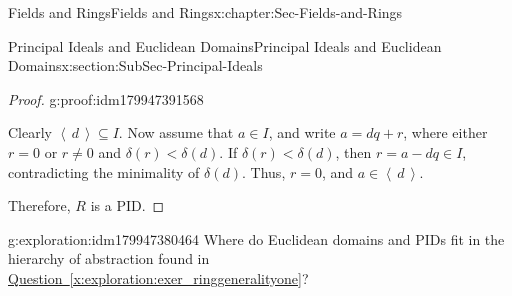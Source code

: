\documentclass[oneside,10pt,]{book}
\newcommand{\xreffont}{\relax}
\numberwithin{equation}{section}
\newcommand{\ideal}[1]{\left\langle\, #1 \,\right\rangle}
\newcommand{\lt}{<}
\begin{document}
\begin{chapterptx}{Fields and Rings}{}{Fields and Rings}{}{}{x:chapter:Sec-Fields-and-Rings}
\begin{sectionptx}{Principal Ideals and Euclidean Domains}{}{Principal Ideals and Euclidean Domains}{}{}{x:section:SubSec-Principal-Ideals}
\begin{proof}{}{g:proof:idm179947391568}
\par
Clearly \(\ideal{d}\subseteq I\). Now assume that \(a\in I\), and write \(a = dq + r\), where either \(r = 0\) or \(r\ne 0\) and \(\delta(r) \lt \delta(d)\). If \(\delta(r) \lt \delta(d)\), then \(r = a - dq \in I\), contradicting the minimality of \(\delta(d)\). Thus, \(r = 0\), and \(a\in \ideal{d}\).%
\par
Therefore, \(R\) is a PID.%
\end{proof}
\begin{exploration}{}{g:exploration:idm179947380464}%
Where do Euclidean domains and PIDs fit in the hierarchy of abstraction found in \hyperref[x:exploration:exer_ringgeneralityone]{Question~{\xreffont\ref{x:exploration:exer_ringgeneralityone}}}?%
\end{exploration}
\end{sectionptx}
\end{chapterptx}
%
%
\typeout{************************************************}
\typeout{************************************************}
%
\end{document}
